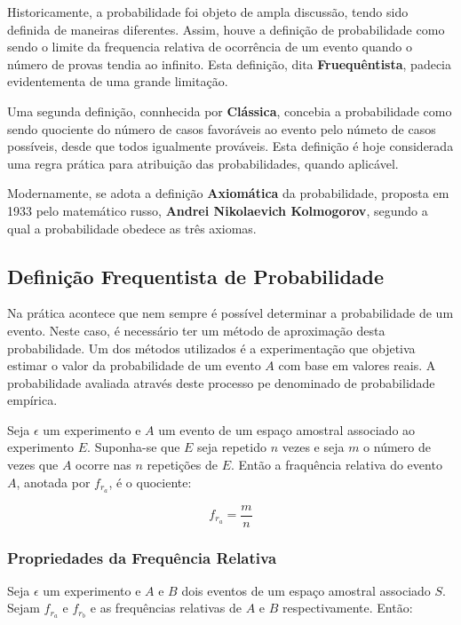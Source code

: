 \inic Historicamente, a probabilidade foi objeto de ampla discussão, tendo sido definida de maneiras diferentes. Assim, houve a definição de probabilidade como sendo o limite da frequencia relativa de ocorrência de um evento quando o número de provas tendia ao infinito. Esta definição, dita \textbf{Fruequêntista}, padecia evidentementa de uma grande limitação.\vskip0.3cm
 
\inic Uma segunda definição, connhecida por \textbf{Clássica}, concebia a probabilidade como sendo quociente do número de casos favoráveis ao evento pelo númeto de casos possíveis, desde que todos igualmente prováveis. Esta definição é hoje considerada uma regra prática para atribuição das probabilidades, quando aplicável.\vskip0.3cm
 
 
\inic Modernamente, se adota a definição \textbf{Axiomática} da probabilidade, proposta em 1933 pelo matemático russo, \textbf{Andrei Nikolaevich Kolmogorov}, segundo a qual a probabilidade obedece as três axiomas.
 
 
\subsection{Definição Frequentista de Probabilidade}

\inic Na prática acontece que nem sempre é possível determinar a probabilidade de um evento. Neste caso, é necessário ter um método de aproximação desta probabilidade. Um dos métodos utilizados é a experimentação que objetiva estimar o valor da probabilidade de um evento $A$ com base em valores reais. A probabilidade avaliada através deste processo pe denominado de probabilidade empírica.\vskip0.3cm

\inic Seja $\epsilon$ um experimento e $A$ um evento de um espaço amostral associado ao experimento $E$. Suponha-se que $E$ seja repetido $n$ vezes e seja $m$ o número de vezes que $A$ ocorre nas $n$ repetições de $E$. Então a fraquência relativa do evento $A$, anotada por $f_{r_{a}}$, é o quociente:
 
\begin{equation}
     f_{r_{a}}= \frac{m}{n}
\end{equation}
 
 
\subsubsection{Propriedades da Frequência Relativa} 

\inic Seja $\epsilon$ um experimento e $A$ e $B$ dois eventos de um espaço amostral associado $S$. Sejam $f_{r_{a}}$ e $f_{r_{b}}$ e as frequências relativas de $A$ e $B$ respectivamente. Então:

